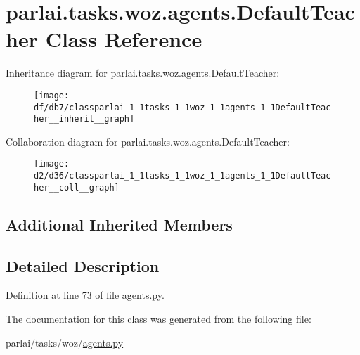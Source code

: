 \hypertarget{classparlai_1_1tasks_1_1woz_1_1agents_1_1DefaultTeacher}{}\section{parlai.\+tasks.\+woz.\+agents.\+Default\+Teacher Class Reference}
\label{classparlai_1_1tasks_1_1woz_1_1agents_1_1DefaultTeacher}


Inheritance diagram for parlai.\+tasks.\+woz.\+agents.\+Default\+Teacher\+:\nopagebreak
\begin{figure}[H]
\begin{center}
\leavevmode
\texttt{[image: df/db7/classparlai\_1\_1tasks\_1\_1woz\_1\_1agents\_1\_1DefaultTeacher\_\_inherit\_\_graph]}
\end{center}
\end{figure}


Collaboration diagram for parlai.\+tasks.\+woz.\+agents.\+Default\+Teacher\+:\nopagebreak
\begin{figure}[H]
\begin{center}
\leavevmode
\texttt{[image: d2/d36/classparlai\_1\_1tasks\_1\_1woz\_1\_1agents\_1\_1DefaultTeacher\_\_coll\_\_graph]}
\end{center}
\end{figure}
\subsection*{Additional Inherited Members}


\subsection{Detailed Description}


Definition at line 73 of file agents.\+py.



The documentation for this class was generated from the following file\+:\begin{DoxyCompactItemize}
\item 
parlai/tasks/woz/\hyperlink{parlai_2tasks_2woz_2agents_8py}{agents.\+py}\end{DoxyCompactItemize}
